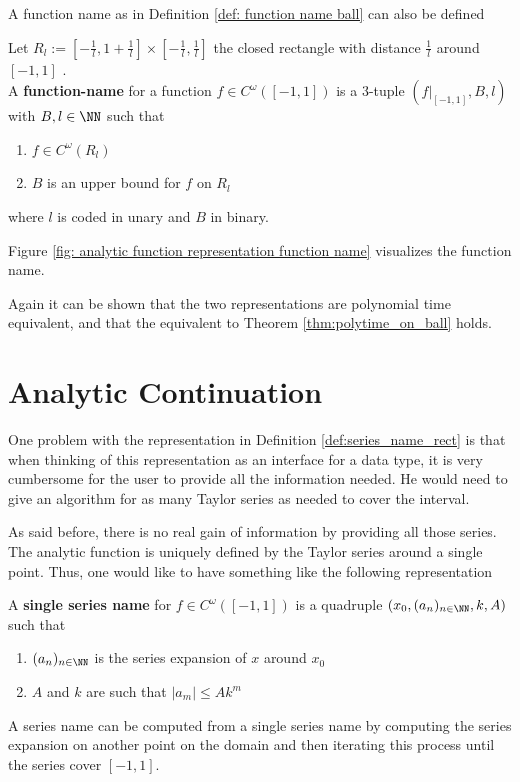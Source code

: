 	A function name as in Definition \ref{def: function name ball} can also be defined
	\begin{definition}
		Let $R_l := [-\frac{1}{l}, 1+\frac{1}{l}] \times [-\frac{1}{l}, \frac{1}{l}]$ the closed rectangle with distance $\frac{1}{l}$ around $[-1,1]$ .\\
		A \textbf{function-name} for a function $f \in C^\omega([-1,1])$ is a 3-tuple $(f|_{[-1,1]}, B, l)$ with $B, l \in \NN$ such that 
		\begin{enumerate}
			\item $f \in C^\omega(R_l)$
			\item $B$ is an upper bound for $f$ on $R_l$
		\end{enumerate}
		where $l$ is coded in unary and $B$ in binary.
	\end{definition}
	Figure \ref{fig: analytic function representation function name} visualizes the function name. 

	Again it can be shown that the two representations are polynomial time equivalent, and that the equivalent to
	Theorem \ref{thm:polytime_on_ball} holds.
	\section{Analytic Continuation}
		One problem with the representation in Definition \ref{def:series_name_rect} is that when thinking of this representation as an interface for a data type, it is very cumbersome for the user to provide all the information needed. 
		He would need to give an algorithm for as many Taylor series as needed to cover the interval.

		As said before, there is no real gain of information by providing all those series.
		The analytic function is uniquely defined by the Taylor series around a single point.
		Thus, one would like to have something like the following representation
		\begin{definition}
			A \textbf{single series name} for $f \in C^\omega([-1,1])$ is a quadruple $(x_0, (a_n)_{n \in \NN}, k, A)$ such that
			\begin{enumerate}
				\item $(a_n)_{n \in \NN}$ is the series expansion of $x$ around $x_0$
				\item $A$ and $k$ are such that $| a_m | \leq Ak^m$ 
			\end{enumerate}
		\end{definition}
		A series name can be computed from a single series name by computing the series expansion on another point on the domain and then iterating this process until the series cover $[-1,1]$.

